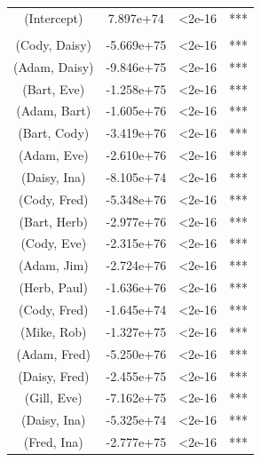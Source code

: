 \documentclass[12pt,oneside]{book}
\begin{document}
\begin{table}[t]
\begin{tabular}{cccc}
%
(Intercept)            &  7.897e+74 &  <2e-16 & ***\\
\\
(Cody, Daisy)  &  	-5.669e+75  &  <2e-16 & ***\\
(Adam, Daisy)  &   -9.846e+75  &   <2e-16 &***\\
(Bart, Eve)  	&   -1.258e+75  &<2e-16 &***\\
(Adam, Bart)  	&   -1.605e+76  & <2e-16 &***\\
(Bart, Cody)  	&   -3.419e+76  & <2e-16 &***\\
(Adam, Eve)  	&   -2.610e+76  & <2e-16 &***\\
(Daisy, Ina)  	&  	-8.105e+74 	 &  <2e-16 &***\\
(Cody, Fred)  	&   -5.348e+76  &<2e-16 &***\\
(Bart, Herb)  	&   -2.977e+76  &<2e-16 &***\\
(Cody, Eve)  	&   -2.315e+76  & <2e-16 &***\\
(Adam, Jim)  	&   -2.724e+76    & <2e-16 &***\\
(Herb, Paul)  	&   -1.636e+76      &<2e-16 &***\\
(Cody, Fred)  	&   -1.645e+74     & <2e-16 &***\\
(Mike, Rob)  	&   -1.327e+75    & <2e-16 &***\\
(Adam, Fred)  	&   -5.250e+76     & <2e-16 &***\\
(Daisy, Fred)  &   -2.455e+75      &<2e-16 &***\\
(Gill, Eve)	  	&   -7.162e+75    & <2e-16 &***\\
(Daisy, Ina)  	&   -5.325e+74      &<2e-16 &***\\
(Fred, Ina)  	&   -2.777e+75     & <2e-16 &***\\

\end{tabular}
\end{table}
\end{document}
